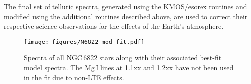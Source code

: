 \documentclass[manuscript]{aastex}
\def\1{\footnotesize I\normalsize}
\begin{document}
The final set of telluric spectra,
generated using the KMOS/esorex routines and modified using the additional routines described above,
are used to correct their respective science observations for the effects of the Earth's atmosphere.



\begin{figure*}
\texttt{[image: figures/N6822\_mod\_fit.pdf]}
\caption{Spectra of all NGC\,6822 stars along with their associated best-fit model spectra.
         The Mg\,\1 lines at 1.1xx and 1.2xx have not been used in the fit due to non-LTE effects.
         }
\label{fig:model_fits}
\end{figure*}









\end{document}
